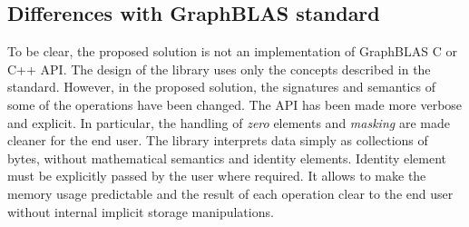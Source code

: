 \subsection{Differences with GraphBLAS standard}

To be clear, the proposed solution is not an implementation of GraphBLAS C or C++ API. 
The design of the library uses only the concepts described in the standard. 
However, in the proposed solution, the signatures and semantics of some of the operations have been changed. 
The API has been made more verbose and explicit. 
In particular, the handling of \textit{zero} elements and \textit{masking} are made cleaner for the end user. The library interprets data simply as collections of bytes, without mathematical semantics and identity elements.
Identity element must be explicitly passed by the user where required. It allows to make the memory usage predictable and the result of each operation clear to the end user without internal implicit storage manipulations.